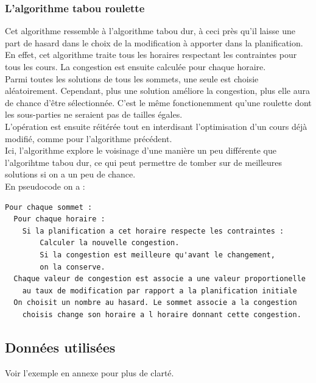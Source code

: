 \documentclass[a4paper,11pt]{article}
\begin{document}
		\subsubsection{L'algorithme tabou roulette}
			Cet algorithme ressemble à l'algorithme tabou dur, à ceci près qu'il laisse une part de hasard dans le choix de la modification à apporter dans la planification.\\
			En effet, cet algorithme traite tous les horaires respectant les contraintes pour tous les cours. La congestion est ensuite calculée pour chaque horaire.\\
			Parmi toutes les solutions de tous les sommets, une seule est choisie aléatoirement. Cependant, plus une solution améliore la congestion, plus elle aura de chance d'être sélectionnée. C'est le même fonctionemment qu'une roulette dont les sous-parties ne seraient pas de tailles égales.\\
			L'opération est ensuite réitérée tout en interdisant l'optimisation d'un cours déjà modifié, comme pour l'algorithme précédent.\\
			Ici, l'algorithme explore le voisinage d'une manière un peu différente que l'algorihtme tabou dur, ce qui peut permettre de tomber sur de meilleures solutions si on a un peu de chance.\\
			En pseudocode on a :\\
\begin{lstlisting}
Pour chaque sommet :
  Pour chaque horaire :
  	Si la planification a cet horaire respecte les contraintes :
    	Calculer la nouvelle congestion.
    	Si la congestion est meilleure qu'avant le changement,
      	on la conserve.
  Chaque valeur de congestion est associe a une valeur proportionelle 
  	au taux de modification par rapport a la planification initiale
  On choisit un nombre au hasard. Le sommet associe a la congestion 
  	choisis change son horaire a l horaire donnant cette congestion.
  \end{lstlisting}
	
	\subsection{Données utilisées}
		Voir l'exemple en annexe pour plus de clarté.
\end{document}
